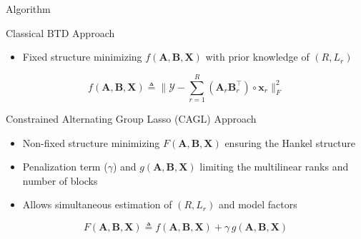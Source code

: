\documentclass{beamer}
\begin{document}
	\begin{frame}{Algorithm}
		
		\begin{block}{Classical BTD Approach}
			\begin{itemize}
				\item Fixed structure minimizing $f(\textbf{A}, \textbf{B}, \textbf{X})$ with prior knowledge of $(R,L_{r})$
			\end{itemize}
		\end{block}
		\vspace{-10pt}
		\begin{equation}
			f(\textbf{A}, \textbf{B}, \textbf{X}) \triangleq
			 \Big\| {\mathcal{Y}} - \textstyle \sum_{r = 1}^{R} \left( \textbf{A}_r \textbf{B}_r^{\top} \right) \circ \textbf{x}_r  \Big\|_F^2
		\end{equation}
		\vspace{-10pt}
		\begin{block}{Constrained Alternating Group Lasso (CAGL) Approach}
			\begin{itemize}
				\item Non-fixed structure minimizing $F(\textbf{A},\textbf{B},\textbf{X})$ ensuring the Hankel structure
				\item Penalization term ($\gamma$) and $g({\textbf{A}, \textbf{B}, \textbf{X}})$ limiting the multilinear ranks and number of blocks
				\item Allows simultaneous estimation of $(R,L_{r})$ and model factors
			\end{itemize}
		\end{block}
		\vspace{-10pt}
		\begin{equation}
				  F({\textbf{A}, \textbf{B}, \textbf{X}})
				 \triangleq  
				 f({\textbf{A}, \textbf{B}, \textbf{X}}) + \gamma \, g({\textbf{A}, \textbf{B}, \textbf{X}})
		\end{equation}
		\vspace{-10pt}
	\end{frame}
\end{document}
